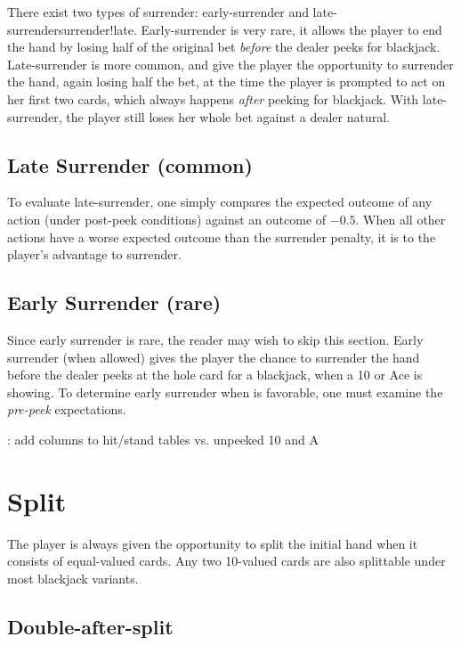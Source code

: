 There exist two types of surrender:
early-surrender and late-surrender{surrender!late}.
Early-surrender is very rare, it allows the player to 
end the hand by losing half of the original bet \emph{before}
the dealer peeks for blackjack.
Late-surrender is more common, and give the player the opportunity to
surrender the hand, again losing half the bet, 
at the time the player is prompted to act on her first two cards, 
which always happens \emph{after} peeking for blackjack.  
With late-surrender, the player still loses her whole bet against 
a dealer natural.

\subsection{Late Surrender (common)}
\label{sec:basic:surrender:late}
To evaluate late-surrender, one simply compares the expected outcome
of any action (under post-peek conditions) against an outcome of $-0.5$.
When all other actions have a worse expected outcome than the surrender
penalty, it is to the player's advantage to surrender.

\subsection{Early Surrender (rare)}
\label{sec:basic:surrender:early}
Since early surrender is rare, the reader may wish to skip this section.
Early surrender (when allowed) gives the player the chance
to surrender the hand before the dealer peeks at the hole card
for a blackjack, when a 10 or Ace is showing.
To determine early surrender when is favorable, 
one must examine the \emph{pre-peek} expectations.

\TODO: add columns to hit/stand tables vs. unpeeked 10 and A

\section{Split}
\label{sec:basic:split}

The player is always given the opportunity to split
the initial hand when it consists of equal-valued cards.
Any two 10-valued cards are also splittable under most blackjack variants.

\subsection{Double-after-split}
\label{sec:basic:DAS}

